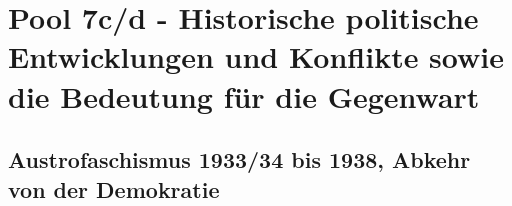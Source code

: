 \documentclass[letterpaper, 12pt]{article}
\let\tempsection\section
\renewcommand\section[1]{\vspace{-0.3cm}\tempsection{#1}\vspace{-0.3cm}}
\let\tempsubsection\subsection
\renewcommand\subsection[1]{\vspace{0cm}\tempsubsection{#1}\vspace{0cm}}
\begin{document}
\parindent 0pt
\parskip 6pt



\clearpage
\thispagestyle{empty}
\tableofcontents

\newpage
{}
\pagestyle{fancy}


\section{Pool 7c/d - Historische politische Entwicklungen und Konflikte sowie die Bedeutung für die Gegenwart \cite{buch}}

\subsection{Austrofaschismus 1933/34 bis 1938, Abkehr von der Demokratie}




\clearpage


\end{document}
